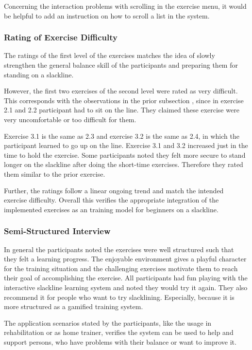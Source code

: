 Concerning the interaction problems with scrolling in the exercise menu, it would be helpful to add an instruction on how to scroll a list in the system.

\subsubsection{Rating of Exercise Difficulty}
The ratings of the first level of the exercises matches the idea of slowly strengthen the general balance skill of the participants and preparing them for standing on a slackline.

However, the first two exercises of the second level were rated as very difficult.
This corresponds with the observations in the prior subsection \textit{}, since in exercise 2.1 and 2.2 participant had to sit on the line.
They claimed these exercise were very uncomfortable or too difficult for them.

Exercise 3.1 is the same as 2.3 and exercise 3.2 is the same as 2.4, in which the participant learned to go up on the line.
Exercise 3.1 and 3.2 increased just in the time to hold the exercise.
Some participants noted they felt more secure to stand longer on the slackline after doing the short-time exercises.
Therefore they rated them similar to the prior exercise.

Further, the ratings follow a linear ongoing trend and match the intended exercise difficulty.
Overall this verifies the appropriate integration of the implemented exercises as an training model for beginners on a slackline.

\subsubsection{Semi-Structured Interview}
In general the participants noted the exercises were well structured such that they felt a learning progress.
The enjoyable environment gives a playful character for the training situation and the challenging exercises motivate them to reach their goal of accomplishing the exercise.
All participants had fun playing with the interactive slackline learning system and noted they would try it again.
They also recommend it for people who want to try slacklining.
Especially, because it is more structured as a gamified training system.

The application scenarios stated by the participants, like the usage in rehabilitation or as home trainer, verifies the system can be used to help and support persons, who have problems with their balance or want to improve it.
